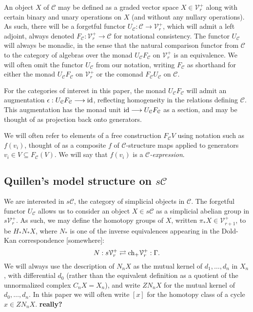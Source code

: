 \documentclass[11pt]{amsart}
\theoremstyle{plain}
\theoremstyle{definition}
\renewcommand{\to}{\longrightarrow}
\newcommand{\calC}{\mathcal{C}}
\newcommand{\calV}{\mathcal{V}}
\theoremstyle{plain}
\newcommand{\vect}[2]{\calV^{#1}_{#2}}
\begin{document}
\begin{Conventions and notation}
An object $X$ of $\calC$ may be defined as a graded vector space $X\in\vect{+}{r}$ along with certain binary and unary operations on $X$ (and without any nullary operations). As such, there will be a forgetful functor $U_\calC:\calC\to\vect{+}{r}$, which will admit a left adjoint, always denoted $F_\calC:\vect{+}{r}\to\calC$ for notational consistency. The functor $U_{\calC}$ will always be monadic, in the sense that the natural comparison functor from $\calC$ to the category of algebras over the monad $U_{\calC}F_{\calC}$ on $\vect{+}{r}$ is an equivalence. We will often omit the functor $U_{\calC}$ from our notation, writing $F_{\calC}$ as shorthand for either the monad $U_{\calC}F_{\calC}$ on $\vect{+}{r}$ or the comonad $F_{\calC}U_{\calC}$ on $\calC$.

For the categories of interest in this paper, the monad $U_{\calC}F_{\calC}$ will admit an augmentation $\epsilon:U_{\calC}F_{\calC}\to\textup{id}$, reflecting homogeneity in the relations defining $\calC$. This augmentation has the monad unit $\textup{id}\to U_{\calC}F_{\calC}$ as a section, and may be thought of as projection back onto generators.

We will often refer to elements of a free construction $F_\calC V$ using notation such as $f(v_i)$, thought of as a composite $f$ of $\calC$-structure maps applied to generators $v_i\in V\subseteq F_\calC(V)$. We will say that $f(v_i)$ is a \emph{$\calC$-expression}.



\subsection{Quillen's model structure on $s\calC$}
We are interested in $s\calC$, the category of simplicial objects in $\calC$. The forgetful functor $U_\calC$ allows us to consider an object $X\in s\calC$ as a simplicial abelian group in $s\vect{+}{r}$. As such, we may define the homotopy groups of $X$, written $\pi_*X\in \vect{+}{r+1}$, to be $H_*N_*X$, where $N_*$ is one of the inverse equivalences appearing in the Dold-Kan correspondence [somewhere]: \[N:s\vect{+}{r}\rightleftarrows \textup{ch}_+ \vect{+}{r}
:\Gamma.\]
We will always use the description of $N_nX$ as the mutual kernel of $d_1,\ldots,d_n$ in $X_n$, with differential $d_0$ (rather than the equivalent definition as a quotient of the unnormalized complex $C_nX=X_n$), and write $ZN_nX$ for the mutual kernel of $d_0,\ldots,d_n$. In this paper we will often write $[x]$ for the homotopy class of a cycle $x\in ZN_nX$. \textbf{really?}


\end{Conventions and notation}
\end{document}
